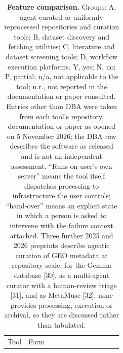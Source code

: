 \documentclass[11pt,a4paper]{article}
\begin{document}
\landscape\scriptsize

\begin{longtable}[]{@{}
  >{\raggedright\arraybackslash}p{}
  >{\raggedright\arraybackslash}p{}
  >{\raggedright\arraybackslash}p{}
  >{\raggedright\arraybackslash}p{}
  >{\raggedright\arraybackslash}p{}
  >{\raggedright\arraybackslash}p{}
  >{\raggedright\arraybackslash}p{}
  >{\raggedright\arraybackslash}p{}
  >{\raggedright\arraybackslash}p{}
  >{\raggedright\arraybackslash}p{}
  >{\raggedright\arraybackslash}p{}
  >{\raggedright\arraybackslash}p{}@{}}
\caption{\label{tab:features}\textbf{Feature comparison.} Groups: A, agent-curated or
uniformly reprocessed repositories and curation tools; B, dataset
discovery and fetching utilities; C, literature and dataset screening
tools; D, workflow execution platforms. Y, yes; N, no; P, partial; n/a,
not applicable to the tool; n.r., not reported in the documentation or
paper consulted. Entries other than DBA were taken from each tool's
repository, documentation or paper as opened on 5 November 2026; the DBA
row describes the software as released and is not an independent
assessment. ``Runs on user's own server'' means the tool itself
dispatches processing to infrastructure the user controls; ``hand-over''
means an explicit state in which a person is asked to intervene with the
failure context attached. Three further 2025 and 2026 preprints describe
agentic curation of GEO metadata at repository scale, for the Gemma
database {[}30{]}, as a multi-agent curator with a human-review triage
{[}31{]}, and as MetaMuse {[}32{]}; none provides processing, execution
or archival, so they are discussed rather than
tabulated.}\tabularnewline
\toprule\noalign{}
\begin{minipage}[b]{\linewidth}\raggedright
Tool
\end{minipage} & \begin{minipage}[b]{\linewidth}\raggedright
Form
\end{minipage} & \begin{minipage}[b]{\linewidth}\raggedright

\end{minipage}
\end{longtable}
\end{document}
